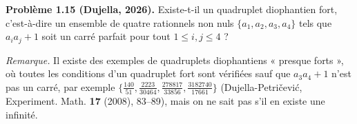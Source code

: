 \textbf{Problème 1.15 (Dujella, 2026).} Existe-t-il un quadruplet diophantien fort, c'est-à-dire un ensemble de quatre rationnels non nuls $\{a_1,a_2,a_3,a_4\}$ tels que $a_ia_j+1$ soit un carré parfait pour tout $1 \leqslant i,j \leqslant 4$ ?

\medskip

\textit{Remarque.} Il existe des exemples de quadruplets diophantiens « presque forts », où toutes les conditions d'un quadruplet fort sont vérifiées sauf que $a_3a_4+1$ n'est pas un carré, par exemple $\{\frac{140}{51}, \frac{2223}{30464}, \frac{278817}{33856}, \frac{3182740}{17661}\}$ (Dujella-Petričević, Experiment. Math. \textbf{17} (2008), 83--89), mais on ne sait pas s'il en existe une infinité.
